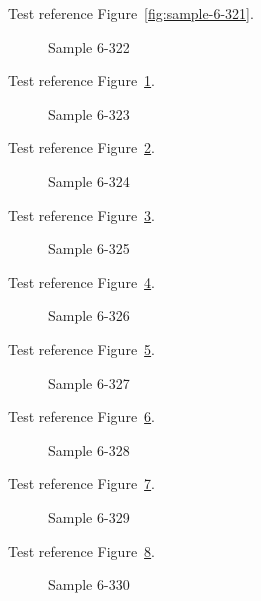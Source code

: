Test reference Figure~\ref{fig:sample-6-321}.

\begin{figure}[tbhp]
\caption{Sample 6-322}
\label{fig:sample-6-322}
\end{figure}

Test reference Figure~\ref{fig:sample-6-322}.

\begin{figure}[tbhp]
\caption{Sample 6-323}
\label{fig:sample-6-323}
\end{figure}

Test reference Figure~\ref{fig:sample-6-323}.

\begin{figure}[tbhp]
\caption{Sample 6-324}
\label{fig:sample-6-324}
\end{figure}

Test reference Figure~\ref{fig:sample-6-324}.

\begin{figure}[tbhp]
\caption{Sample 6-325}
\label{fig:sample-6-325}
\end{figure}

Test reference Figure~\ref{fig:sample-6-325}.

\begin{figure}[tbhp]
\caption{Sample 6-326}
\label{fig:sample-6-326}
\end{figure}

Test reference Figure~\ref{fig:sample-6-326}.

\begin{figure}[tbhp]
\caption{Sample 6-327}
\label{fig:sample-6-327}
\end{figure}

Test reference Figure~\ref{fig:sample-6-327}.

\begin{figure}[tbhp]
\caption{Sample 6-328}
\label{fig:sample-6-328}
\end{figure}

Test reference Figure~\ref{fig:sample-6-328}.

\begin{figure}[tbhp]
\caption{Sample 6-329}
\label{fig:sample-6-329}
\end{figure}

Test reference Figure~\ref{fig:sample-6-329}.

\begin{figure}[tbhp]
\caption{Sample 6-330}
\label{fig:sample-6-330}
\end{figure}

